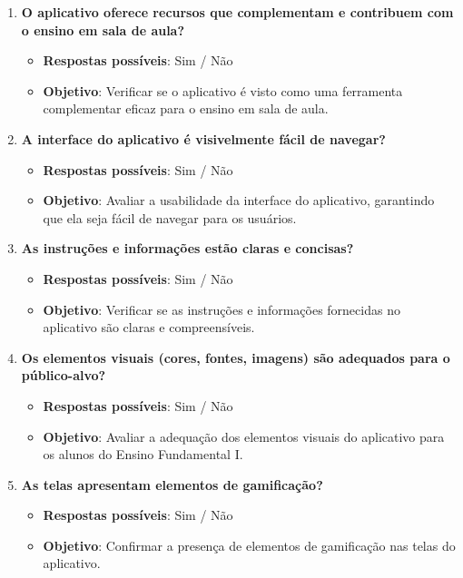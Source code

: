 \begin{enumerate}
    \item \textbf{O aplicativo oferece recursos que complementam e contribuem com o ensino em sala de aula?}
    \begin{itemize}
        \item \textbf{Respostas possíveis}: Sim / Não
        \item \textbf{Objetivo}: Verificar se o aplicativo é visto como uma ferramenta complementar eficaz para o ensino em sala de aula.
    \end{itemize}

    \item \textbf{A interface do aplicativo é visivelmente fácil de navegar?}
    \begin{itemize}
        \item \textbf{Respostas possíveis}: Sim / Não
        \item \textbf{Objetivo}: Avaliar a usabilidade da interface do aplicativo, garantindo que ela seja fácil de navegar para os usuários.
    \end{itemize}

    \item \textbf{As instruções e informações estão claras e concisas?}
    \begin{itemize}
        \item \textbf{Respostas possíveis}: Sim / Não
        \item \textbf{Objetivo}: Verificar se as instruções e informações fornecidas no aplicativo são claras e compreensíveis.
    \end{itemize}

    \item \textbf{Os elementos visuais (cores, fontes, imagens) são adequados para o público-alvo?}
    \begin{itemize}
        \item \textbf{Respostas possíveis}: Sim / Não
        \item \textbf{Objetivo}: Avaliar a adequação dos elementos visuais do aplicativo para os alunos do Ensino Fundamental I.
    \end{itemize}

    \item \textbf{As telas apresentam elementos de gamificação?}
    \begin{itemize}
        \item \textbf{Respostas possíveis}: Sim / Não
        \item \textbf{Objetivo}: Confirmar a presença de elementos de gamificação nas telas do aplicativo.
    \end{itemize}


\end{enumerate}
